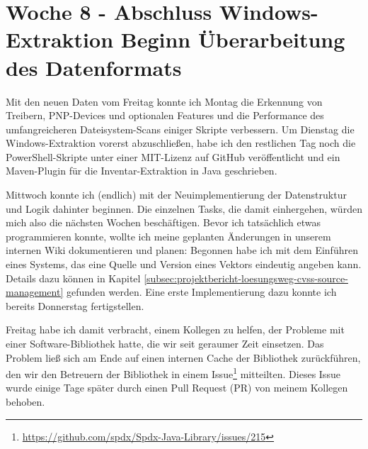\section{Woche 8 - Abschluss Windows-Extraktion \headerand Beginn Überarbeitung des Datenformats} \label{sec:bericht-wo-8}


\lweekdaymarginpar{\weekdayMondayShort, \weekdayTuesdayShort}

Mit den neuen Daten vom Freitag konnte ich Montag die Erkennung von Treibern, PNP-Devices und optionalen Features und die Performance des umfangreicheren Dateisystem-Scans einiger Skripte verbessern.
Um Dienstag die Windows-Extraktion vorerst abzuschließen, habe ich den restlichen Tag noch die PowerShell-Skripte unter einer MIT-Lizenz auf GitHub veröffentlicht und ein Maven-Plugin für die Inventar-Extraktion in Java geschrieben.

\sweekdaymarginpar{\weekdayWednesdayShort, \weekdayThursdayShort}

Mittwoch konnte ich (endlich) mit der Neuimplementierung der Datenstruktur und Logik dahinter beginnen.
Die einzelnen Tasks, die damit einhergehen, würden mich also die nächsten Wochen beschäftigen.
Bevor ich tatsächlich etwas programmieren konnte, wollte ich meine geplanten Änderungen in unserem internen Wiki dokumentieren und planen:
Begonnen habe ich mit dem Einführen eines Systems, das eine Quelle und Version eines Vektors eindeutig angeben kann.
Details dazu können in Kapitel \ref{subsec:projektbericht-loesungsweg-cvss-source-management} gefunden werden.
Eine erste Implementierung dazu konnte ich bereits Donnerstag fertigstellen.

\sweekdaymarginpar{\weekdayFridayLong}

Freitag habe ich damit verbracht, einem Kollegen zu helfen, der Probleme mit einer Software-Bibliothek hatte, die wir seit geraumer Zeit einsetzen.
Das Problem ließ sich am Ende auf einen internen Cache der Bibliothek zurückführen, den wir den Betreuern der Bibliothek in einem Issue\footnote{\url{https://github.com/spdx/Spdx-Java-Library/issues/215}} mitteilten.
Dieses Issue wurde einige Tage später durch einen Pull Request (PR) von meinem Kollegen behoben.
